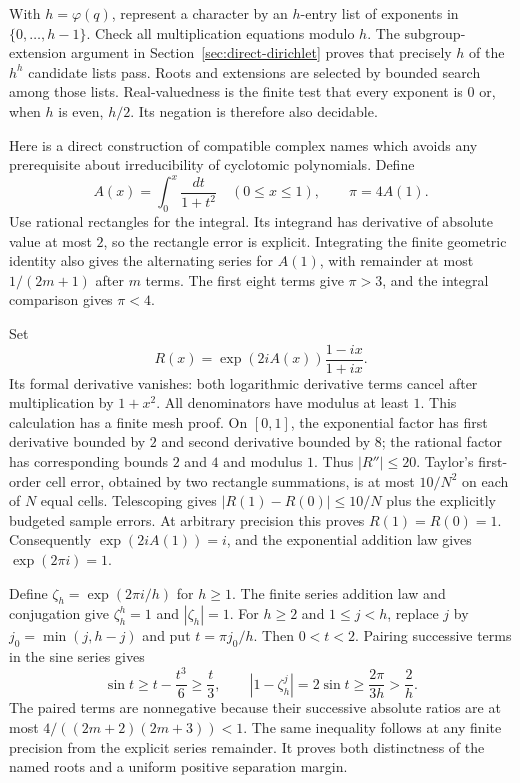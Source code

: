 With $h=\varphi(q)$, represent a character by an $h$-entry list of exponents in $\{0,\ldots,h-1\}$. Check all multiplication equations modulo $h$. The subgroup-extension argument in Section~\ref{sec:direct-dirichlet} proves that precisely $h$ of the $h^h$ candidate lists pass. Roots and extensions are selected by bounded search among those lists. Real-valuedness is the finite test that every exponent is $0$ or, when $h$ is even, $h/2$. Its negation is therefore also decidable.

Here is a direct construction of compatible complex names which avoids any prerequisite about irreducibility of cyclotomic polynomials. Define
\[
 A(x)=\int_0^x\frac{dt}{1+t^2}\quad(0\leq x\leq1),\qquad \pi=4A(1).
\]
Use rational rectangles for the integral. Its integrand has derivative of absolute value at most $2$, so the rectangle error is explicit. Integrating the finite geometric identity also gives the alternating series for $A(1)$, with remainder at most $1/(2m+1)$ after $m$ terms. The first eight terms give $\pi>3$, and the integral comparison gives $\pi<4$.

Set
\[
 R(x)=\exp(2iA(x))\frac{1-ix}{1+ix}.
\]
Its formal derivative vanishes: both logarithmic derivative terms cancel after multiplication by $1+x^2$. All denominators have modulus at least $1$. This calculation has a finite mesh proof. On $[0,1]$, the exponential factor has first derivative bounded by $2$ and second derivative bounded by $8$; the rational factor has corresponding bounds $2$ and $4$ and modulus $1$. Thus $|R''|\leq20$. Taylor's first-order cell error, obtained by two rectangle summations, is at most $10/N^2$ on each of $N$ equal cells. Telescoping gives $|R(1)-R(0)|\leq10/N$ plus the explicitly budgeted sample errors. At arbitrary precision this proves $R(1)=R(0)=1$. Consequently $\exp(2iA(1))=i$, and the exponential addition law gives $\exp(2\pi i)=1$.

Define $\zeta_h=\exp(2\pi i/h)$ for $h\geq1$. The finite series addition law and conjugation give $\zeta_h^h=1$ and $|\zeta_h|=1$. For $h\geq2$ and $1\leq j<h$, replace $j$ by $j_0=\min(j,h-j)$ and put $t=\pi j_0/h$. Then $0<t<2$. Pairing successive terms in the sine series gives
\[
 \sin t\geq t-\frac{t^3}{6}\geq\frac t3,
 \qquad
 |1-\zeta_h^j|=2\sin t\geq\frac{2\pi}{3h}>\frac2h.
\]
The paired terms are nonnegative because their successive absolute ratios are at most $4/((2m+2)(2m+3))<1$. The same inequality follows at any finite precision from the explicit series remainder. It proves both distinctness of the named roots and a uniform positive separation margin.

